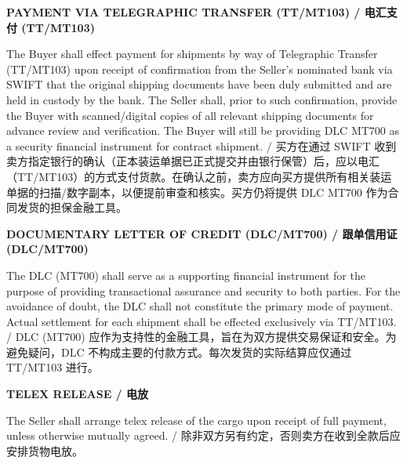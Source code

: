 \documentclass[a4paper,11pt]{article}
\begin{document}
\vspace{0.3cm}
\begin{center}{\large\textbf{\color{marooncolor}PAYMENT VIA TELEGRAPHIC TRANSFER (TT/MT103) / 电汇支付 (TT/MT103)}}\end{center}
\vspace{0.1cm}
\noindent The Buyer shall effect payment for shipments by way of Telegraphic Transfer (TT/MT103) upon receipt of confirmation from the Seller's nominated bank via SWIFT that the original shipping documents have been duly submitted and are held in custody by the bank. The Seller shall, prior to such confirmation, provide the Buyer with scanned/digital copies of all relevant shipping documents for advance review and verification. The Buyer will still be providing DLC MT700 as a security financial instrument for contract shipment. / 买方在通过 SWIFT 收到卖方指定银行的确认（正本装运单据已正式提交并由银行保管）后，应以电汇（TT/MT103）的方式支付货款。在确认之前，卖方应向买方提供所有相关装运单据的扫描/数字副本，以便提前审查和核实。买方仍将提供 DLC MT700 作为合同发货的担保金融工具。

\vspace{0.3cm}
\begin{center}{\large\textbf{\color{marooncolor}DOCUMENTARY LETTER OF CREDIT (DLC/MT700) / 跟单信用证 (DLC/MT700)}}\end{center}
\vspace{0.1cm}
\noindent The DLC (MT700) shall serve as a supporting financial instrument for the purpose of providing transactional assurance and security to both parties. For the avoidance of doubt, the DLC shall not constitute the primary mode of payment. Actual settlement for each shipment shall be effected exclusively via TT/MT103. / DLC (MT700) 应作为支持性的金融工具，旨在为双方提供交易保证和安全。为避免疑问，DLC 不构成主要的付款方式。每次发货的实际结算应仅通过 TT/MT103 进行。

\vspace{0.3cm}
\begin{center}{\large\textbf{\color{marooncolor}TELEX RELEASE / 电放}}\end{center}
\vspace{0.1cm}
\noindent The Seller shall arrange telex release of the cargo upon receipt of full payment, unless otherwise mutually agreed. / 除非双方另有约定，否则卖方在收到全款后应安排货物电放。

\newpage
\end{document}

